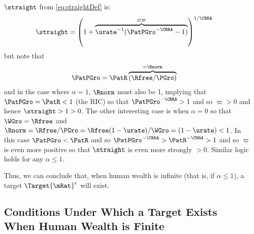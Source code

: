 \documentclass{\handout}
\begin{document}
$\straight$ from \eqref{eq:straightDef} is:
\begin{equation}\begin{gathered}\begin{aligned}
  \straight & =  \left(1+\overbrace{\urate^{-1}(\PatPGro^{-\CRRA}-1)}^{\equiv \varpi}\right)^{1/\CRRA}
\end{aligned}\end{gathered}\end{equation}
but note that 
\begin{equation}\begin{gathered}\begin{aligned}
  \PatPGro & =  \PatR \overbrace{(\Rfree/\PGro)}^{=\Rnorm}
\end{aligned}\end{gathered}\end{equation}
and in the case where $\alpha=1$, $\Rnorm$ must also be 1, implying that $\PatPGro = \PatR < 1$ (the RIC) so that $\PatPGro^{-\CRRA} > 1$ and so $\varpi > 0$ and hence $\straight > 1 > 0$.  The other interesting case is when $\alpha=0$ so that $\WGro=\Rfree$ and $\Rnorm=\Rfree/\PGro=\Rfree(1-\urate)/\WGro=(1-\urate)<1$.  In this case $\PatPGro < \PatR$ and so $\PatPGro^{-\CRRA} > \PatR^{-\CRRA} > 1$ and so $\varpi$ is even more positive so that $\straight$ is even more strongly $>0$.  Similar logic holds for any $\alpha \leq 1$.  

Thus, we can conclude that, when human wealth is infinite (that is, if $\alpha \leq 1$), a target $\Target{\mRat}^{e}$ will exist.  

\subsection{Conditions Under Which a Target Exists When Human Wealth is Finite}
\end{document}
